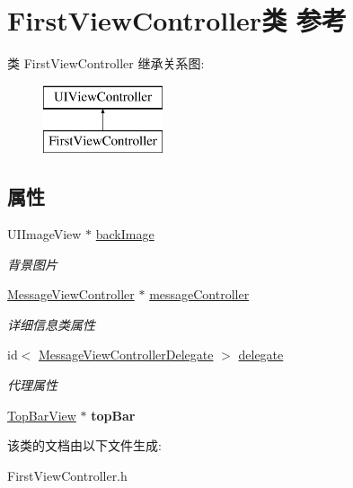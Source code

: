 \hypertarget{interface_first_view_controller}{\section{First\-View\-Controller类 参考}
\label{interface_first_view_controller}
}
类 First\-View\-Controller 继承关系图\-:\begin{figure}[H]
\begin{center}
\leavevmode
\includegraphics[height=2.000000cm]{interface_first_view_controller}
\end{center}
\end{figure}
\subsection*{属性}
\begin{DoxyCompactItemize}
\item 
\hypertarget{interface_first_view_controller_a65a02e3ccdea1bdad12876753128d70c}{U\-I\-Image\-View $\ast$ \hyperlink{interface_first_view_controller_a65a02e3ccdea1bdad12876753128d70c}{back\-Image}}\label{interface_first_view_controller_a65a02e3ccdea1bdad12876753128d70c}

\begin{DoxyCompactList}\small\item\em 背景图片 \end{DoxyCompactList}\item 
\hypertarget{interface_first_view_controller_a62b6bc49cb1220b3a9c7e2db4eb2e7f0}{\hyperlink{interface_message_view_controller}{Message\-View\-Controller} $\ast$ \hyperlink{interface_first_view_controller_a62b6bc49cb1220b3a9c7e2db4eb2e7f0}{message\-Controller}}\label{interface_first_view_controller_a62b6bc49cb1220b3a9c7e2db4eb2e7f0}

\begin{DoxyCompactList}\small\item\em 详细信息类属性 \end{DoxyCompactList}\item 
\hypertarget{interface_first_view_controller_a9a1f1917619813af29912f67c6a6eea9}{id$<$ \hyperlink{protocol_message_view_controller_delegate-p}{Message\-View\-Controller\-Delegate} $>$ \hyperlink{interface_first_view_controller_a9a1f1917619813af29912f67c6a6eea9}{delegate}}\label{interface_first_view_controller_a9a1f1917619813af29912f67c6a6eea9}

\begin{DoxyCompactList}\small\item\em 代理属性 \end{DoxyCompactList}\item 
\hypertarget{interface_first_view_controller_addd0b613f437a2af7380a1749b0ae6b3}{\hyperlink{interface_top_bar_view}{Top\-Bar\-View} $\ast$ {\bfseries top\-Bar}}\label{interface_first_view_controller_addd0b613f437a2af7380a1749b0ae6b3}

\end{DoxyCompactItemize}


该类的文档由以下文件生成\-:\begin{DoxyCompactItemize}
\item 
First\-View\-Controller.\-h\end{DoxyCompactItemize}
